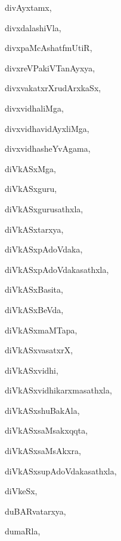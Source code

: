 \begin{multicols}{3}
{\noindent
{divAyxtamx}, \pageref{divAyxtamx}

\noindent
{divxdalashiVla}, \pageref{divxdalashiVla}

\noindent
{divxpaMcAshatfmUtiR}, \pageref{divxpaMcAshatfmUtiR}

\noindent
{divxreVPakiVTanAyxya}, \pageref{divxreVPakiVTanAyxya}

\noindent
{divxvakatxrXrudArxkaSx}, \pageref{divxvakatxrXrudArxkaSx}

\noindent
{divxvidhaliMga}, \pageref{divxvidhaliMga}

\noindent
{divxvidhavidAyxliMga}, \pageref{divxvidhavidAyxliMga}

\noindent
{divxvidhasheYvAgama}, \pageref{divxvidhasheYvAgama}

\noindent
{diVkASxMga}, \pageref{diVkASxMga}

\noindent
{diVkASxguru}, \pageref{diVkASxguru}

\noindent
{diVkASxgurusathxla}, \pageref{diVkASxgurusathxla}

\noindent
{diVkASxtarxya}, \pageref{diVkASxtarxya}

\noindent
{diVkASxpAdoVdaka}, \pageref{diVkASxpAdoVdaka}

\noindent
{diVkASxpAdoVdakasathxla}, \pageref{diVkASxpAdoVdakasathxla}

\noindent
{diVkASxBasita}, \pageref{diVkASxBasita}

\noindent
{diVkASxBeVda}, \pageref{diVkASxBeVda}

\noindent
{diVkASxmaMTapa}, \pageref{diVkASxmaMTapa}

\noindent
{diVkASxvasatxrX}, \pageref{diVkASxvasatxrX}

\noindent
{diVkASxvidhi}, \pageref{diVkASxvidhi}

\noindent
{diVkASxvidhikarxmasathxla}, \pageref{diVkASxvidhikarxmasathxla}

\noindent
{diVkASxshuBakAla}, \pageref{diVkASxshuBakAla}

\noindent
{diVkASxsaMsakxqqta}, \pageref{diVkASxsaMsakxqqta}

\noindent
{diVkASxsaMsAkxra}, \pageref{diVkASxsaMsAkxra}

\noindent
{diVkASxsupAdoVdakasathxla}, \pageref{diVkASxsupAdoVdakasathxla}

\noindent
{diVkeSx}, \pageref{diVkeSx}

\noindent
{duBARvatarxya}, \pageref{duBARvatarxya}

\noindent
{dumaRla}, \pageref{dumaRla}

}
\end{multicols}

